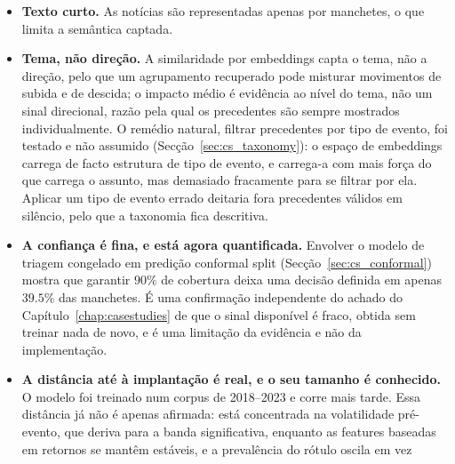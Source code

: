 \begin{itemize}
        primeira é uma decisão deste trabalho. O valor é um limite superior, porque pergunta se
        existia \emph{uma} história e não se existia a \emph{certa}; estabelecer a segunda exigiria
        julgamento humano dia a dia. A cobertura é também marcadamente desigual: o nome pior coberto
        chega apenas a $50\%$ enquanto cinco nomes ultrapassam $97\%$, e o pior coberto é
        simultaneamente o de maior densidade de manchetes, ou seja a sua cobertura chega aos
        arrancos. A explicação óbvia, truncagem contra o tecto de itens por pedido do fornecedor, foi
        testada e rejeitada: nenhuma janela de pedido do corpus chegou a um terço desse tecto.
  \item \textbf{Texto curto.} As notícias são representadas apenas por manchetes, o que limita a
        semântica captada.
  \item \textbf{Tema, não direção.} A similaridade por embeddings capta o tema, não a direção, pelo
        que um agrupamento recuperado pode misturar movimentos de subida e de descida; o impacto médio
        é evidência ao nível do tema, não um sinal direcional, razão pela qual os precedentes são
        sempre mostrados individualmente. O remédio natural, filtrar precedentes por tipo de evento,
        foi testado e não assumido (Secção~\ref{sec:cs_taxonomy}): o espaço de embeddings carrega de
        facto estrutura de tipo de evento, e carrega-a com mais força do que carrega o assunto, mas
        demasiado fracamente para se filtrar por ela. Aplicar um tipo de evento errado deitaria fora
        precedentes válidos em silêncio, pelo que a taxonomia fica descritiva.
  \item \textbf{A confiança é fina, e está agora quantificada.} Envolver o modelo de triagem congelado
        em predição conformal split (Secção~\ref{sec:cs_conformal}) mostra que garantir $90\%$ de
        cobertura deixa uma decisão definida em apenas $39.5\%$ das manchetes. É uma confirmação
        independente do achado do Capítulo~\ref{chap:casestudies} de que o sinal disponível é fraco,
        obtida sem treinar nada de novo, e é uma limitação da evidência e não da implementação.
  \item \textbf{A distância até à implantação é real, e o seu tamanho é conhecido.} O modelo foi
        treinado num corpus de 2018--2023 e corre mais tarde. Essa distância já não é apenas afirmada:
        está concentrada na volatilidade pré-evento, que deriva para a banda significativa, enquanto
        as features baseadas em retornos se mantêm estáveis, e a prevalência do rótulo oscila em vez

\end{itemize}
